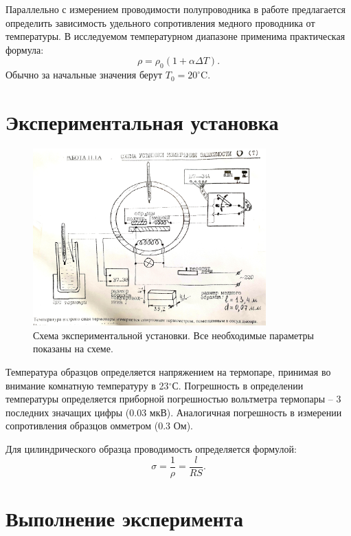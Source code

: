\documentclass[a4paper, 14pt]{extarticle}%
\newcommand\ECaption[1]{%
     \captionsetup{font=footnotesize}%
     \caption{#1}}
\begin{document}
Параллельно с измерением проводимости полупроводника в работе предлагается определить зависимость удельного сопротивления медного проводника от температуры. В исследуемом температурном диапазоне применима практическая формула:
\begin{equation}
\rho = \rho_0(1 + \alpha \Delta T).
\end{equation}
Обычно за начальные значения берут $T_0 = 20^{\circ}$C.
\newpage
\section*{Экспериментальная установка}

\begin{figure}[h]
\begin{center}
\includegraphics[width=0.8\textwidth]{UST}
\end{center}
\ECaption{Схема экспериментальной установки. Все необходимые параметры показаны на схеме.}
\end{figure}

Температура образцов определяется напряжением на термопаре, принимая во внимание комнатную температуру в 23$^{\circ}$С. Погрешность в определении температуры определяется приборной погрешностью вольтметра термопары -- 3 последних значащих цифры (0.03 мкВ). Аналогичная погрешность в измерении сопротивления образцов омметром (0.3 Ом).

Для цилиндрического образца проводимость определяется формулой:
\begin{equation}
\sigma = \dfrac{1}{\rho} = \frac{l}{RS}.
\end{equation}
\newpage
\section*{Выполнение эксперимента}
\end{document}
